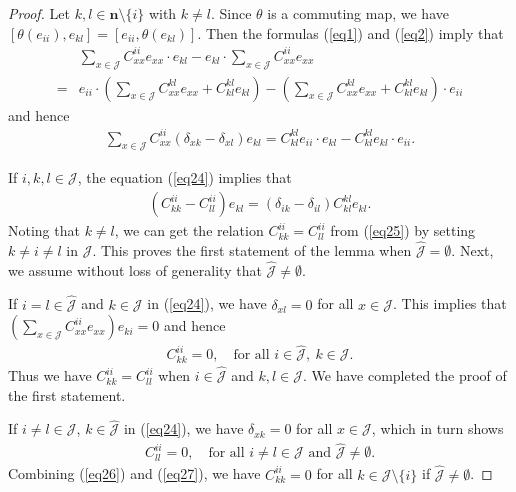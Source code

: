 \documentclass[reqno]{amsart}
\theoremstyle{plain}
\theoremstyle{definition}
\begin{document}
\begin{proof}
Let $k, l \in \mathbf{n} \setminus \{i\}$ with $k \neq l$.
Since $\theta$ is a commuting map, we have $[\theta(e_{ii}), e_{kl}] = [e_{ii}, \theta(e_{kl})]$. Then the formulas (\ref{eq1}) and (\ref{eq2}) imply that
\[
\begin{aligned}
&\sum_{x \in \mathcal{J}} C_{xx}^{ii} e_{xx} \cdot  e_{kl} - e_{kl}\cdot  \sum_{x \in \mathcal{J}} C_{xx}^{ii} e_{xx}\\
 =& e_{ii} \cdot  \left( \sum_{x \in \mathcal{J}} C_{xx}^{kl} e_{xx} + C_{kl}^{kl} e_{kl} \right) - \left( \sum_{x \in \mathcal{J}} C_{xx}^{kl} e_{xx} + C_{kl}^{kl} e_{kl} \right) \cdot  e_{ii}
\end{aligned}
\]
and hence
 \begin{align}\label{eq24}
\sum_{x \in \mathcal{J}} C_{xx}^{ii} ( \delta_{xk}-\delta_{xl}) e_{kl} = C_{kl}^{kl}e_{ii} \cdot  e_{kl} - C_{kl}^{kl} e_{kl} \cdot  e_{ii}. 
\end{align}

If $i, k, l \in \mathcal{J}$, the equation (\ref{eq24}) implies that
 \begin{align}\label{eq25}
(C_{kk}^{ii} - C_{ll}^{ii}) e_{kl} = (\delta_{ik} - \delta_{il}) C_{kl}^{kl} e_{kl}. 
 \end{align}
Noting that $k \neq l$, we can get the relation $C_{kk}^{ii} = C_{ll}^{ii}$ from (\ref{eq25}) by setting $k \neq i \neq l$ in $\mathcal{J}$.
This  proves the first statement of the lemma when  $\hat{\mathcal{J}}= \emptyset$.
Next, we assume without loss of generality that $\hat{\mathcal{J}} \neq \emptyset$.

If $i = l \in \hat{\mathcal{J}}$ and $k \in \mathcal{J}$ in (\ref{eq24}), we have $\delta_{xl}=0$ for all $x\in \mathcal{J}$. This implies that $\left( \sum_{x \in \mathcal{J}} C_{xx}^{ii} e_{xx} \right) e_{ki} = 0$ and hence
 \begin{align}\label{eq26}
C_{kk}^{ii} = 0, \quad \text{for all } i \in \hat{\mathcal{J}},~k \in \mathcal{J} .
\end{align}
Thus we have $C_{kk}^{ii} = C_{ll}^{ii}$ when $i \in \hat{\mathcal{J}}$ and $k, l \in \mathcal{J}$. We have
completed the proof of the first statement.

If $i \neq l \in \mathcal{J}$, $k \in \hat{\mathcal{J}}$ in (\ref{eq24}), we have $\delta_{xk}=0$ for all $x\in \mathcal{J}$, which in turn shows
 \begin{align}\label{eq27}
C_{ll}^{ii} = 0, \quad \text{for all } i \neq l \in \mathcal{J} \text{ and } \hat{\mathcal{J}} \neq \emptyset. 
 \end{align}
Combining (\ref{eq26}) and (\ref{eq27}), we have $C_{kk}^{ii} = 0$ for all $k \in \mathcal{J} \setminus \{i\}$ if $\hat{\mathcal{J}} \neq \emptyset$.
\end{proof}
\end{document}
